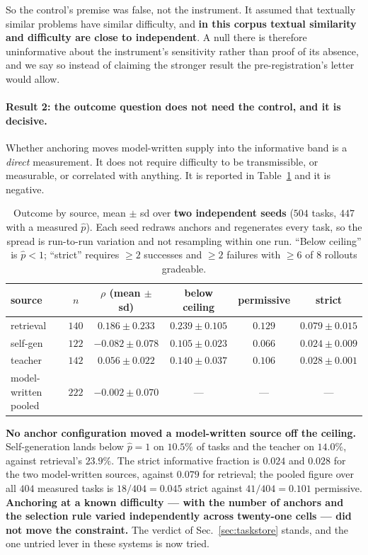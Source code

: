 So the control's premise was false, not the instrument. It assumed that textually similar
problems have similar difficulty, and \textbf{in this corpus textual similarity and difficulty
are close to independent}. A null there is therefore uninformative about the instrument's
sensitivity rather than proof of its absence, and we say so instead of claiming the stronger
result the pre-registration's letter would allow.

\paragraph{Result 2: the outcome question does not need the control, and it is decisive.}
Whether anchoring moves model-written supply into the informative band is a \emph{direct}
measurement. It does not require difficulty to be transmissible, or measurable, or correlated
with anything. It is reported in Table~\ref{tab:anchorout} and it is negative.

\begin{table}[t]
\centering\small
\caption{Outcome by source, mean $\pm$ sd over \textbf{two independent seeds} ($504$ tasks,
$447$ with a measured $\hat p$). Each seed redraws anchors and regenerates every task, so the
spread is run-to-run variation and not resampling within one run. ``Below ceiling'' is
$\hat p < 1$; ``strict'' requires $\ge 2$ successes and $\ge 2$ failures with $\ge 6$ of $8$
rollouts gradeable.}
\label{tab:anchorout}
\begin{tabular}{lccccc}
\toprule
source & $n$ & $\rho$ (mean $\pm$ sd) & below ceiling & permissive & \textbf{strict} \\
\midrule
retrieval  & $140$ & $0.186 \pm 0.233$ & $0.239 \pm 0.105$ & $0.129$ & $\mathbf{0.079 \pm 0.015}$ \\
self-gen   & $122$ & $-0.082 \pm 0.078$ & $0.105 \pm 0.023$ & $0.066$ & $\mathbf{0.024 \pm 0.009}$ \\
teacher    & $142$ & $0.056 \pm 0.022$ & $0.140 \pm 0.037$ & $0.106$ & $\mathbf{0.028 \pm 0.001}$ \\
\midrule
model-written pooled & $222$ & $-0.002 \pm 0.070$ & --- & --- & --- \\
\bottomrule
\end{tabular}
\end{table}

\textbf{No anchor configuration moved a model-written source off the ceiling.} Self-generation
lands below $\hat p = 1$ on $10.5\%$ of tasks and the teacher on $14.0\%$, against retrieval's
$23.9\%$. The strict informative fraction is $\mathbf{0.024}$ and $\mathbf{0.028}$ for the two
model-written sources, against $0.079$ for retrieval; the pooled figure over all $404$ measured
tasks is $18/404 = \mathbf{0.045}$ strict against $41/404 = 0.101$ permissive. \textbf{Anchoring
at a known difficulty --- with the number of anchors and the selection rule varied
independently across twenty-one cells --- did not move the constraint.} The verdict of
Sec.~\ref{sec:taskstore} stands, and the one untried lever in these systems is now tried.

